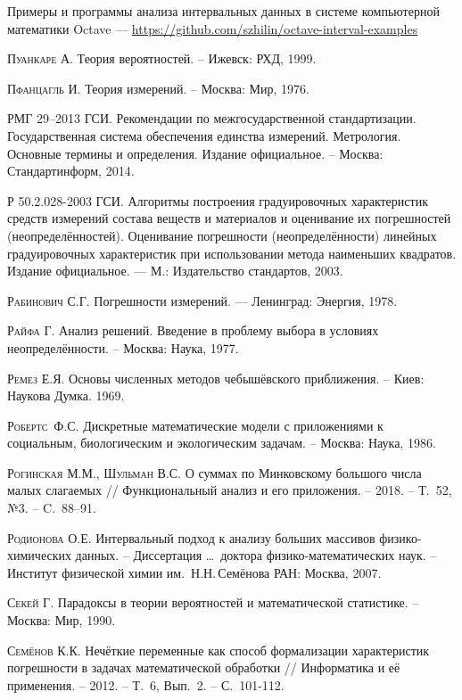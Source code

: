 \documentclass[a5paper,openany]{book}
\begin{document}
\begin{thebibliography}{999}
Примеры и программы анализа интервальных данных в системе компьютерной математики Octave 
--- \url{https://github.com/szhilin/octave-interval-examples}
  
\textsc{Пуанкаре А.} Теория вероятностей. -- Ижевск: РХД, 1999. 
  
\textsc{Пфанцагль И.} Теория измерений. -- Москва: Мир, 1976. 
  
РМГ 29--2013 ГСИ. Рекомендации по межгосударственной стандартизации. Государственная 
система обеспечения единства измерений. Метрология. Основные термины и определения. 
Издание официальное. -- Москва:  Стандартинформ, 2014. 
  
Р 50.2.028-2003 ГСИ. Алгоритмы построения градуировочных характеристик средств измерений 
состава веществ и материалов и оценивание их погрешностей (неопределённостей). Оценивание 
погрешности (неопределённости) линейных градуировочных характеристик при использовании 
метода наименьших квадратов. Издание официальное. --- М.: Издательство стандартов, 2003. 
  
\textsc{Рабинович С.Г.} Погрешности измерений. — Ленинград: Энергия, 1978. 
  
\textsc{Райфа Г.} Анализ решений. Введение в проблему выбора в условиях неопределённости. 
-- Москва: Наука, 1977.  
  
\textsc{Ремез Е.Я.} Основы численных методов чебышёвского приближения. -- Киев: 
Наукова Думка. 1969. 
  
\textsc{Робертс~Ф.С.} Дискретные математические модели с приложениями к социальным, 
биологическим и экологическим задачам. -- Москва: Наука, 1986. 
  
\textsc{Рогинская М.М., Шульман В.С.} О суммах по Минковскому большого числа малых 
слагаемых // Функциональный анализ и его приложения. -- 2018. -- Т.~52, №3. -- C.~88--91. 
   
\textsc{Родионова О.Е.} Интервальный подход к анализу больших массивов физико-химических 
данных. -- Диссертация  \ldots\, доктора физико-математических наук. -- Институт 
физической химии им.~Н.Н.\,Семёнова РАН: Москва, 2007. 
  
\textsc{Секей Г.} Парадоксы в теории вероятностей и математической статистике. 
-- Москва: Мир, 1990. 
  
\textsc{Семёнов К.К.} Нечёткие переменные как способ формализации характеристик 
погрешности в задачах математической обработки // Информатика и её применения. -- 
2012. -- Т.~6, Вып.~2. -- С.~101-112. 
  

\end{thebibliography}
\end{document}
